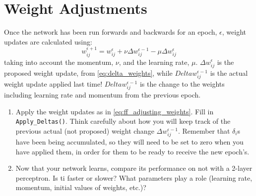 \documentclass[a4paper,10pt]{article}
\begin{document}
\section{Weight Adjustments}
Once the network has been run forwards and backwards for an epoch, $\epsilon$, weight updates are calculated using:
\begin{equation}
\label{eq:ff_adjusting_weights}
w_{ij}^{\epsilon +1} = w_{ij}^{\epsilon} +  \nu \Delta w_{ij}^{\epsilon - 1}  - \mu \Delta w_{ij}^{\epsilon}
\end{equation}
taking into account the momentum, $\nu$, and the learning rate, $\mu$.  $\Delta w_{ij}^{\epsilon}$ is the proposed weight update, from \autoref{eq:delta_weights}, while $Delta w_{ij}^{\epsilon - 1}$  is the actual weight update applied last time! $Delta w_{ij}^{\epsilon - 1}$ is the change to the weights including learning rate and momentum from the previous epoch.

\begin{enumerate}

\item Apply the weight updates as in \autoref{eq:ff_adjusting_weights}. Fill in \texttt{Apply\_Deltas()}. Think carefully about how you will keep track of the previous actual (not proposed) weight change $\Delta w_{ij}^{\epsilon-1}$. Remember that $\delta_i$s have been being accumulated, so they will need to be set to zero when you have applied them, in order for them to be ready to receive the new epoch's.

\item Now  that your network learns, compare its performance on not with a 2-layer perceptron. Is ti faster or slower? What parameters play a role (learning rate, momentum, initial values of weights, etc.)? 



 
 \end{enumerate}

\end{document}
